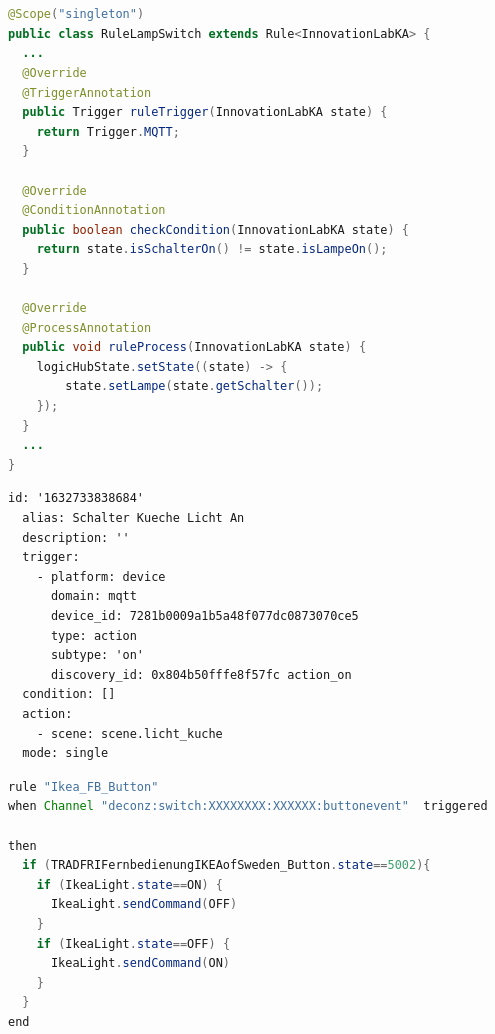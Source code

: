\documentclass[
  ngerman           %
  ,twoside          %
  ,11pt
  ,pdftex
]{report}
\begin{document}
\chapter{}
\label{appendix:steuerzentrale}
\begin{lstlisting}[language=Java, frame=lines, xleftmargin=\parindent, style=algoBericht, label={code:switch}, captionpos=b, caption={Regeldefinition der Lichtschaltung}]
@Scope("singleton")
public class RuleLampSwitch extends Rule<InnovationLabKA> {
  ...
  @Override
  @TriggerAnnotation
  public Trigger ruleTrigger(InnovationLabKA state) {
    return Trigger.MQTT;
  }
  
  @Override
  @ConditionAnnotation
  public boolean checkCondition(InnovationLabKA state) {
    return state.isSchalterOn() != state.isLampeOn();
  }
  
  @Override
  @ProcessAnnotation
  public void ruleProcess(InnovationLabKA state) {
    logicHubState.setState((state) -> {
        state.setLampe(state.getSchalter());
    });
  }
  ...
}
\end{lstlisting}
\pagebreak
\label{appendix:hoasAutomation}
\begin{lstlisting}[language=xml, frame=lines, xleftmargin=\parindent, style=algoBericht, label={code:hoasAutomation}, captionpos=b, caption={Regeldefinition der Lichtschaltung über Home Assistant}]
  id: '1632733838684'
  alias: Schalter Kueche Licht An
  description: ''
  trigger:
    - platform: device
      domain: mqtt
      device_id: 7281b0009a1b5a48f077dc0873070ce5
      type: action
      subtype: 'on'
      discovery_id: 0x804b50fffe8f57fc action_on
  condition: []
  action:
    - scene: scene.licht_kuche
  mode: single
\end{lstlisting}

\label{appendix:openhabCode}
\begin{lstlisting}[language=Java, frame=lines, xleftmargin=\parindent, style=algoBericht, label={code:openhabSwitch}, captionpos=b, caption={Regeldefinition der Lichtschaltung via openHAB}]
rule "Ikea_FB_Button" 
when Channel "deconz:switch:XXXXXXXX:XXXXXX:buttonevent"  triggered
         
then
  if (TRADFRIFernbedienungIKEAofSweden_Button.state==5002){
    if (IkeaLight.state==ON) {
      IkeaLight.sendCommand(OFF)
    }
    if (IkeaLight.state==OFF) {
      IkeaLight.sendCommand(ON)
    }
  }
end
\end{lstlisting}

\chapter{}
\label{appendix:usabilitytestpaper}




\end{document}

